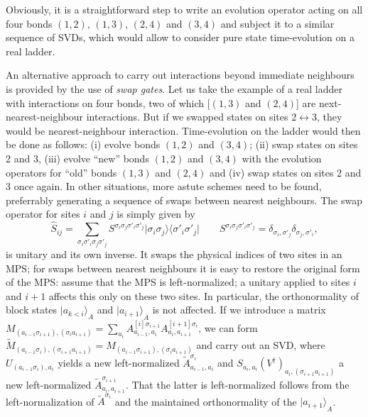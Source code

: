 \documentclass[a4paper,10pt,oneside,onecolumn,1p,times]{elsarticle}
\newcommand{\bra}[1]{\mbox{$\langle #1  |$}}
\newcommand{\ket}[1]{\mbox{$| #1  \rangle$}}
\begin{document}
Obviously, it is a straightforward step to write an evolution operator acting on all four bonds $(1,2)$, $(1,3)$, $(2,4)$ and $(3,4)$ and subject it to a similar sequence of SVDs, which would allow to consider pure state time-evolution on a real ladder. 

An alternative approach to carry out interactions beyond immediate neighbours is provided by the use of {\em swap gates}\cite{Stoudenmire10}. Let us take the example of a real ladder with interactions on four bonds, two of which [$(1,3)$ and $(2,4)$] are next-nearest-neighbour interactions. But if we swapped states on sites $2 \leftrightarrow 3$, they would be nearest-neighbour interaction. Time-evolution on the ladder would then be done as follows: (i) evolve bonds $(1,2)$ and $(3,4)$; (ii) swap states on sites 2 and 3, (iii) evolve ``new'' bonds $(1,2)$ and $(3,4)$ with the evolution operators for ``old'' bonds $(1,3)$ and $(2,4)$ and (iv) swap states on sites 2 and 3 once again. In other situations, more astute schemes need to be found, preferrably generating a sequence of swaps between nearest neighbours. The swap operator for sites $i$ and $j$ is simply given by
\begin{equation}
\hat{S}_{ij} = \sum_{\sigma_i\sigma'_i \sigma_j\sigma'_j} S^{\sigma_i\sigma_j \sigma'_i \sigma'_j} \ket{\sigma_i\sigma_j}\bra{\sigma'_i\sigma'_j} \quad\quad 
S^{\sigma_i\sigma_j \sigma'_i \sigma'_j} = \delta_{\sigma_i,\sigma'_j} \delta_{\sigma_j,\sigma'_i},
\end{equation}
is unitary and its own inverse. It swaps the physical indices of two sites in an MPS; for swaps between nearest neighbours it is easy to restore the original form of the MPS: assume that the MPS is left-normalized; a unitary applied to sites $i$ and $i+1$ affects this only on these two sites. In particular, the orthonormality of block states $\ket{a_{k<i}}_A$ and $\ket{a_{i+1}}_A$ is not affected.
If we introduce a matrix $M_{(a_{i-1}\sigma_{i+1}),(\sigma_i a_{i+1})} = \sum_{a_i} A^{[i]\sigma_{i+1}}_{a_{i-1},a_i} A^{[i+1]\sigma_i}_{a_i,a_{i+1}}$, we can form $\tilde{M}_{(a_{i-1}\sigma_i),(\sigma_{i+1}a_{i+1})}=M_{(a_{i-1}\sigma_{i+1}),(\sigma_i a_{i+1})}$ and carry out an SVD, where $U_{(a_{i-1}\sigma_i),a_i}$ yields a new left-normalized $\tilde{A}^{\sigma_i}_{a_{i-1},a_i}$ and 
$S_{a_i,a_i} (V^\dagger)_{a_i,(\sigma_{i+1}a_{i+1})}$ a new left-normalized $\tilde{A}^{\sigma_{i+1}}_{a_{i},a_{i+1}}$. That the latter is left-normalized follows from the left-normalization of $\tilde{A}^{\sigma_i}$ and the maintained orthonormality of the $\ket{a_{i+1}}_A$.
\end{document}
